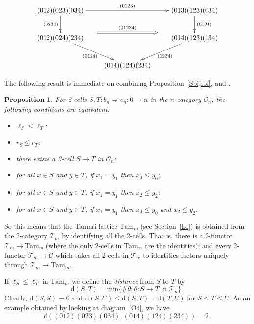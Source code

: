 \documentclass[a4paper,12pt,reqno]{amsart}
\newtheorem{proposition}[theorem]{Proposition}
\theoremstyle{definition}
\theoremstyle{fact}
\theoremstyle{genquest}
\theoremstyle{step}
\newcommand{\lra}{\longrightarrow}
\newcommand{\Lra}{\Longrightarrow}
\def\CC{{\mathscr C}}
\def\CO{{\mathscr O}}
\def\CT{{\mathscr T}}
\begin{document}
\begin{equation}\label{O4}
\xymatrix{
(012)(023)(034) \ar[d]_{(0234)}^(0.8){\phantom{AAAAAAAA}}="1" \ar[rr]^{(0123)}  && (013)(123)(034) \ar[d]^{(0134)}_(0.8){\phantom{AAAAAAAA}}="2" \ar@{=>}"1";"2"^-{(01234)}
\\
(012)(024)(234) \ar[rd]_-{(0124)} && (014)(123)(134) \ar[ld]^-{(1234)} 
\\
& (014)(124)(234) 
}
\end{equation}

The following result is immediate on combining Proposition~\ref{Sbijlbf}, \cite{HT} and \cite{aos}.

\begin{proposition}\label{TLatt} For 2-cells $S,T:b_n\Lra e_n : 0\lra n$ in the $n$-category 
$\CO_n$, the following conditions are equivalent:
\begin{itemize}
\item[(i)] $\ell_S \le \ell_T$;
\item[(ii)] $r_S \le r_T$;
\item[(iii)] there exists a 3-cell $S\lra T$ in $\CO_n$;
\item[(iv)] for all $x\in S$ and $y\in T$, if $x_1=y_1$ then $x_0\le y_0$; 
\item[(v)] for all $x\in S$ and $y\in T$, if $x_1=y_1$ then $x_2\le y_2$;
\item[(vi)] for all $x\in S$ and $y\in T$, if $x_1=y_1$ then $x_0\le y_0$ and $x_2\le y_2$.
\end{itemize}
\end{proposition}

So this means that the Tamari lattice $\mathrm{Tam}_m$ 
(see Section~\ref{Bf}) is obtained from the 2-category
$\CT_m$ by identifying all the 2-cells. That is, there is a 2-functor
$\CT_m \lra \mathrm{Tam}_m$ (where the only 2-cells in 
$\mathrm{Tam}_m$ are the identities); and every 2-functor 
$\CT_m \lra \CC$ which takes all 2-cells in $\CT_m$ to identities
factors uniquely through $\CT_m \lra \mathrm{Tam}_m$. 

If $\ell_S \le \ell_T$ in $\mathrm{Tam}_n$, we define the {\em distance} 
from $S$ to $T$ by
\begin{equation}
\mathrm{d}(S,T) = \mathrm{min} \{\# \theta : \theta : S \lra T \text{ in } \CT_n \} \ .
\end{equation}
Clearly, $\mathrm{d}(S,S) = 0$ and $\mathrm{d}(S,U) \le \mathrm{d}(S,T)+\mathrm{d}(T,U)$ for $S\le T\le U$. 
As an example obtained by looking at diagram~\eqref{O4}, we have
$$\mathrm{d}((012)(023)(034), (014)(124)(234)) = 2 \ .$$
  
\end{document}
